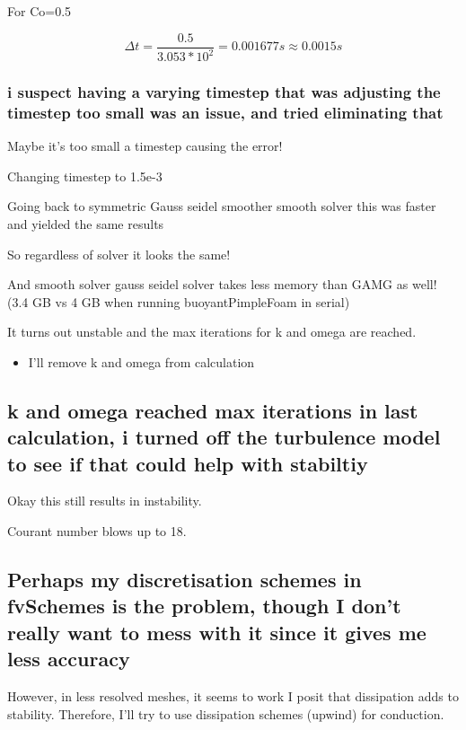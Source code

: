 \documentclass[12pt]{article}
\renewcommand{\_}{\kern-1.5pt\textunderscore\kern-1.5pt}
\begin{document}
For Co=0.5\par

 \[  \Delta t=\frac{0.5}{3.053\ast10^{2}}=0.001677s \approx 0.0015s \] \par


\subsubsection{i suspect having a varying timestep that was adjusting the timestep too small was an issue, and tried eliminating that}
Maybe it’s too small a timestep causing the error!\par

Changing timestep to 1.5e-3\par

Going back to symmetric Gauss seidel smoother smooth solver  this was faster and yielded the same results\par

So regardless of solver it looks the same!\par

And smooth solver gauss seidel solver takes less memory than GAMG as well! (3.4 GB vs 4 GB when running buoyantPimpleFoam in serial)\par

It turns out unstable and the max iterations for k and omega are reached.\par

\begin{itemize}

	\item I’ll remove k and omega from calculation\par

\end{itemize}

\vspace{\baselineskip}
\subsection{k and omega reached max iterations in last calculation, i turned off the turbulence model to see if that could help with stabiltiy}
Okay this still results in instability.\par

Courant number blows up to 18.\par

\subsection{Perhaps my discretisation schemes in fvSchemes is the problem, though I don’t really want to mess with it since it gives me less accuracy}\par
However, in less resolved meshes, it seems to work  I posit that dissipation adds to stability. Therefore, I’ll try to use dissipation schemes (upwind) for conduction.\par
\end{document}
